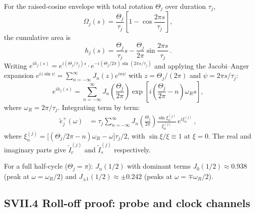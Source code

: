 \documentclass[aps,pra,twocolumn,superscriptaddress,longbibliography]{revtex4-2}
\newcommand{\be}{\begin{equation}}
\newcommand{\ee}{\end{equation}}
\begin{document}
       For the raised-cosine envelope with total rotation $\Theta_j$ over duration $\tau_j$,       
       \be
         \Omega_j(s) = \frac{\Theta_j}{\tau_j}\!\left[1-\cos\!\frac{2\pi s}{\tau_j}\right],        
         \label{eq:RC_def}
       \ee
       the cumulative area is
       \be
         h_j(s) = \frac{\Theta_j}{\tau_j}s - \frac{\Theta_j}{2\pi}\sin\!\frac{2\pi
       s}{\tau_j}\,.
       \ee
       Writing $e^{ih_j(s)} = e^{i(\Theta_j/\tau_j)s}\cdot e^{-i(\Theta_j/2\pi)\sin(2\pi
       s/\tau_j)}$
       and applying the Jacobi--Anger expansion
       $e^{iz\sin\psi}=\sum_{n=-\infty}^{\infty}J_n(z)e^{in\psi}$
       with $z=\Theta_j/(2\pi)$ and $\psi=2\pi s/\tau_j$:
       \be
         e^{ih_j(s)} = \sum_{n=-\infty}^{\infty}J_n\!\!\left(\frac{\Theta_j}{2\pi}\right)
           \exp\!\!\left[i\!\left(\frac{\Theta_j}{2\pi}-n\right)\!\omega_R s\right]\!,
       \ee
       where $\omega_R=2\pi/\tau_j$.  Integrating term by term:
       \begin{align}
         \tilde{e}_j^+(\omega) &=
       \tau_j\sum_{n=-\infty}^{\infty}J_n\!\!\left(\frac{\Theta_j}{2\pi}\right)
           \frac{\sin\xi_n^{(j)}}{\xi_n^{(j)}}\,e^{i\xi_n^{(j)}}\,,
         \label{eq:eplus_exact}
       \end{align}
       where $\xi_n^{(j)} = \bigl[(\Theta_j/2\pi - n)\omega_R - \omega\bigr]\tau_j/2$,
       with $\sin\xi/\xi \equiv 1$ at $\xi=0$.
       The real and imaginary parts give $\tilde{I}_c^{(j)}$ and $\tilde{I}_s^{(j)}$
       respectively.

       For a full half-cycle ($\Theta_j=\pi$): $J_n(1/2)$ with dominant terms
       $J_0(1/2)\approx 0.938$ (peak at $\omega=\omega_R/2$) and
       $J_{\pm 1}(1/2)\approx \pm 0.242$ (peaks at $\omega=\mp\omega_R/2$).

       \subsection*{SVII.4 Roll-off proof: probe and clock channels}
\end{document}
